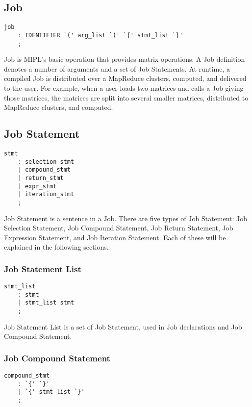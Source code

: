 \documentclass[prodmode,acmtecs]{acmsmall}
\begin{document}
\subsection{Job}

\begin{lstlisting}
job
	: IDENTIFIER `(' arg_list `)' `{' stmt_list `}'
	;
\end{lstlisting}

\label{Job_Section}
Job is MIPL's basic operation that provides matrix operations.
A Job definition denotes a number of arguments and a set of Job
Statements.  At runtime, a compiled Job is distributed over
a MapReduce clusters, computed, and delivered to the user. For
example, when a user loads two matrices and calls a Job giving those
matrices, the matrices are split into several smaller matrices,
distributed to MapReduce clusters, and computed.


\subsection{Job Statement}

\begin{lstlisting}
stmt
	: selection_stmt
	| compound_stmt
	| return_stmt
	| expr_stmt
	| iteration_stmt
	;
\end{lstlisting}

Job Statement is a sentence in a Job.  There are five types of
Job Statement: Job Selection Statement, Job Compound Statement,
Job Return Statement, Job Expression Statement, and Job Iteration
Statement.  Each of these will be explained in the following
sections.

\subsubsection{Job Statement List}

\begin{lstlisting}
stmt_list
	: stmt
	| stmt_list stmt
	;
\end{lstlisting}

Job Statement List is a set of Job Statement, used in Job
declarations and Job Compound Statement.


\subsubsection{Job Compound Statement}

\begin{lstlisting}
compound_stmt
	: `{' `}'
	| `{' stmt_list `}'
	;
\end{lstlisting}
\end{document}
